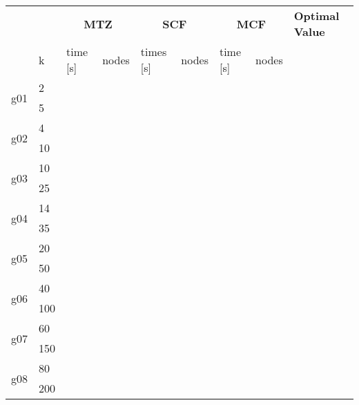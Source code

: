 
\begin{tabular}{ l l l l l l l l l}
  \multicolumn{2}{c}{} & \multicolumn{2}{c}{\textbf{MTZ}} & \multicolumn{2}{c}{\textbf{SCF}} & \multicolumn{2}{c}{\textbf{MCF}} & \textbf{Optimal Value}\\
                       & k   & time [s] & nodes & times [s] & nodes & time [s] & nodes &   \\
  \hline
  \multirow{2}{*}{g01} & 2   &          &       &           &       &          &       &   \\
                       & 5   &          &       &           &       &          &       &   \\
  \hline
  \multirow{2}{*}{g02} & 4   &          &       &           &       &          &       &   \\
                       & 10  &          &       &           &       &          &       &   \\
  \hline
  \multirow{2}{*}{g03} & 10  &          &       &           &       &          &       &   \\
                       & 25  &          &       &           &       &          &       &   \\
  \hline
  \multirow{2}{*}{g04} & 14  &          &       &           &       &          &       &   \\
                       & 35  &          &       &           &       &          &       &   \\
  \hline
  \multirow{2}{*}{g05} & 20  &          &       &           &       &          &       &   \\
                       & 50  &          &       &           &       &          &       &   \\
  \hline
  \multirow{2}{*}{g06} & 40  &          &       &           &       &          &       &   \\
                       & 100 &          &       &           &       &          &       &   \\
  \hline
  \multirow{2}{*}{g07} & 60  &          &       &           &       &          &       &   \\
                       & 150 &          &       &           &       &          &       &   \\
  \hline
  \multirow{2}{*}{g08} & 80  &          &       &           &       &          &       &   \\
                       & 200 &          &       &           &       &          &       &   \\
  \hline
\end{tabular}
